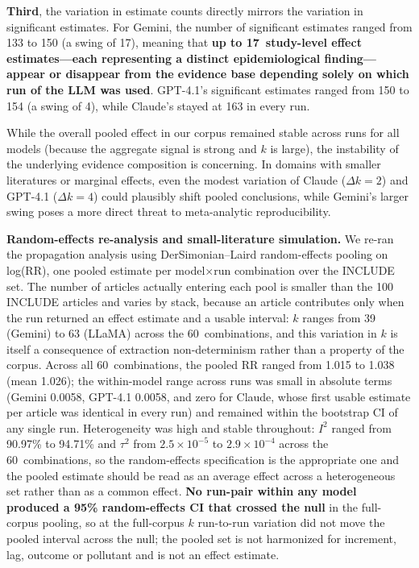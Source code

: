 \documentclass[11pt]{article}
\begin{document}
\textbf{Third}, the variation in estimate counts directly mirrors the variation in significant estimates.
For Gemini, the number of significant estimates ranged from 133 to 150 (a swing of 17), meaning that \textbf{up to 17~study-level effect estimates---each representing a distinct epidemiological finding---appear or disappear from the evidence base depending solely on which run of the LLM was used}.
GPT-4.1's significant estimates ranged from 150 to 154 (a swing of 4), while Claude's stayed at 163 in every run.

While the overall pooled effect in our corpus remained stable across runs for all models (because the aggregate signal is strong and $k$ is large), the instability of the underlying evidence composition is concerning.
In domains with smaller literatures or marginal effects, even the modest variation of Claude ($\Delta k{=}2$) and GPT-4.1 ($\Delta k{=}4$) could plausibly shift pooled conclusions, while Gemini's larger swing poses a more direct threat to meta-analytic reproducibility.

\medskip
\noindent\textbf{Random-effects re-analysis and small-literature simulation.}
We re-ran the propagation analysis using DerSimonian--Laird random-effects pooling on log(RR), one pooled estimate per model${\times}$run combination over the INCLUDE set.
The number of articles actually entering each pool is smaller than the 100 INCLUDE articles and varies by stack, because an article contributes only when the run returned an effect estimate and a usable interval: $k$ ranges from 39 (Gemini) to 63 (LLaMA) across the 60~combinations, and this variation in $k$ is itself a consequence of extraction non-determinism rather than a property of the corpus.
Across all 60~combinations, the pooled RR ranged from 1.015 to 1.038 (mean 1.026); the within-model range across runs was small in absolute terms (Gemini 0.0058, GPT-4.1 0.0058, and zero for Claude, whose first usable estimate per article was identical in every run) and remained within the bootstrap CI of any single run.
Heterogeneity was high and stable throughout: $I^2$ ranged from 90.97\% to 94.71\% and $\tau^2$ from $2.5{\times}10^{-5}$ to $2.9{\times}10^{-4}$ across the 60~combinations, so the random-effects specification is the appropriate one and the pooled estimate should be read as an average effect across a heterogeneous set rather than as a common effect.
\textbf{No run-pair within any model produced a 95\% random-effects CI that crossed the null} in the full-corpus pooling, so at the full-corpus $k$ run-to-run variation did not move the pooled interval across the null; the pooled set is not harmonized for increment, lag, outcome or pollutant and is not an effect estimate.
\end{document}
